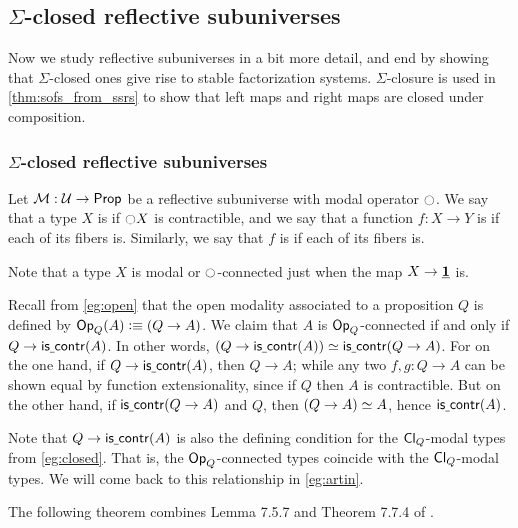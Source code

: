 \subsection{\texorpdfstring{$\Sigma$}{Σ}-closed reflective subuniverses}
\label{sec:ssrs}

Now we study reflective subuniverses in a bit more detail, and end by
showing that $\Sigma$-closed ones give rise to stable factorization
systems. $\Sigma$-closure is used in \autoref{thm:sofs_from_ssrs} to
show that left maps and right maps are closed under composition.



\subsubsection{$\Sigma$-closed reflective subuniverses}
\label{sec:sigma-closed}

\begin{defn}\label{defn:connected}
Let $\mathcal{M}:\mathcal{U}\to\mathsf{Prop}$ be a reflective subuniverse with modal
operator ${\ocircle}$. We say
that a type $X$ is  if ${\ocircle} X$ is contractible,
and we say that a function $f:X\to Y$ is  if each
of its fibers is. Similarly, we say that $f$ is  if each of its
fibers is.
\end{defn}

Note that a type $X$ is modal or ${\ocircle}$-connected just when the map $X\to\underline{\mathbf{1}}$ is.

\begin{eg}\label{eg:closed-connected}
  Recall from \cref{eg:open} that the open modality associated to a proposition $Q$ is defined by $\mathsf{Op}_{Q}(A) \vcentcolon\equiv (Q\to A)$.
  We claim that $A$ is $\mathsf{Op}_{Q}$-connected if and only if $Q \to\mathsf{is\underline{\ }{}contr}(A)$.
  In other words, $(Q \to\mathsf{is\underline{\ }{}contr}(A))\simeq \mathsf{is\underline{\ }{}contr}(Q\to A)$.
  For on the one hand, if $Q\to \mathsf{is\underline{\ }{}contr}(A)$, then $Q\to A$; while any two $f,g:Q\to A$ can be shown equal by function extensionality, since if $Q$ then $A$ is contractible.
  But on the other hand, if $\mathsf{is\underline{\ }{}contr}(Q\to A)$ and $Q$, then $\eqv{(Q\to A)}{A}$, hence $\mathsf{is\underline{\ }{}contr}(A)$.

  Note that $Q \to\mathsf{is\underline{\ }{}contr}(A)$ is also the defining condition for the $\mathsf{Cl}_{Q}$-modal types from \cref{eg:closed}.
  That is, the $\mathsf{Op}_{Q}$-connected types coincide with the $\mathsf{Cl}_{Q}$-modal types.
  We will come back to this relationship in \cref{eg:artin}.
\end{eg}

The following theorem combines Lemma 7.5.7 and Theorem 7.7.4 of \cite{TheBook}.

